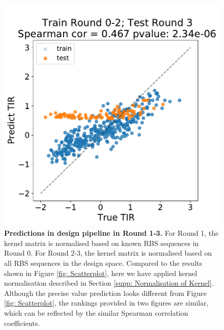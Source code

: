 \begin{figure}[!ht]
    \includegraphics[scale = 0.35]{plots/Supplementary/scatter_abc1_TT_2.pdf}
    \caption{\textbf{Predictions in design pipeline in Round 1-3.} For Round 1, the kernel matrix is normalised based on known RBS sequences in Round 0.
    For Round 2-3, the kernel matrix is normalised based on all RBS sequences in the design space.
    Compared to the results shown in Figure \mbox{\ref{fig: Scatterplot}}, here we have applied kernel normalisation described in Section \mbox{\ref{supp: Normalisation of Kernel}}. Although the precise value prediction looks different from Figure \mbox{\ref{fig: Scatterplot}}, the rankings provided in two figures are similar, which can be reflected by the similar Spearman correlation coefficients.
    }
    \label{fig:scatter abc1 TT.}
\end{figure}


